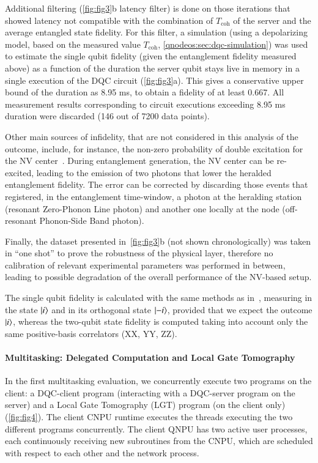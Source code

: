 Additional filtering (\cref{fig:fig3}b latency filter) is done on those iterations that showed latency not compatible with the combination of $T_{\text{coh}}$ of the server and the average entangled state fidelity. For this filter, a simulation (using a depolarizing model, based on the measured value $T_{\text{coh}}$, \cref{qnodeos:sec:dqc-simulation}) was used to estimate the single qubit fidelity (given the entanglement fidelity measured above) as a function of the duration the server qubit stays live in memory in a single execution of the DQC circuit (\cref{fig:fig3}a). This gives a conservative upper bound of the duration as 8.95 ms, to obtain a fidelity of at least 0.667. All measurement results corresponding to circuit executions exceeding 8.95 ms duration were discarded (146 out of 7200 data points). 

Other main sources of infidelity, that are not considered in this analysis of the outcome, include, for instance, the non-zero probability of double excitation for the NV center~\cite{hermans2023entangling}. During entanglement generation, the NV center can be re-excited, leading to the emission of two photons that lower the heralded entanglement fidelity. The error can be corrected by discarding those events that registered, in the entanglement time-window, a photon at the heralding station (resonant Zero-Phonon Line photon) and another one locally at the node (off-resonant Phonon-Side Band photon). 

Finally, the dataset presented in~\cref{fig:fig3}b (not shown chronologically) was taken in “one shot” to prove the robustness of the physical layer, therefore no calibration of relevant experimental parameters was performed in between, leading to possible degradation of the overall performance of the NV-based setup.

The single qubit fidelity is calculated with the same methods as in~\cite{iuliano2024qubit}, measuring in the state $\ket{i}$ and in its orthogonal state $\ket{-i}$, provided that we expect the outcome $\ket{i}$, whereas the two-qubit state fidelity is computed taking into account only the same positive-basis correlators (XX, YY, ZZ).

\paragraph{Multitasking: Delegated Computation and Local Gate Tomography}

In the first multitasking evaluation, we concurrently execute two programs on the client: a DQC-client program (interacting with a DQC-server program on the server) and a Local Gate Tomography (LGT) program (on the client only) (\cref{fig:fig4}). The client CNPU runtime executes the threads executing the two different programs concurrently. The client QNPU has two active user processes, each continuously receiving new subroutines from the CNPU, which are scheduled with respect to each other and the network process.

